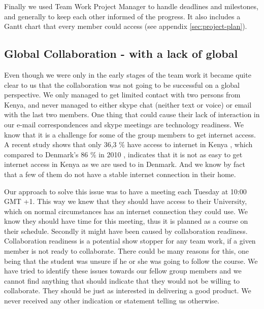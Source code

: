 Finally we used Team Work Project Manager to handle deadlines and milestones, and generally to keep each other informed of the progress. It also includes a Gantt chart that every member could access (see appendix \ref{sec:project-plan}).

\subsection{Global Collaboration - with a lack of global} \label{sec:teamworkgonewrong}
Even though we were only in the early stages of the team work it became quite clear to us that the collaboration was not going to be successful on a global perspective. We only managed to get limited contact with two persons from Kenya, and never managed to either skype chat (neither text or voice) or email with the last two members. One thing that could cause their lack of interaction in our e-mail correspondences and skype meetings are technology readiness. We know that it is a challenge for some of the group members to get internet access. A recent study shows that only 36,3 \% have access to internet in Kenya \cite{capitalfm2012internet}, which compared to Denmark's 86 \% in 2010 \cite{folketingets-eu-oplysning}, indicates that it is not as easy to get internet access in Kenya as we are used to in Denmark. And we know by fact that a few of them do not have a stable internet connection in their home. 

Our approach to solve this issue was to have a meeting each Tuesday at 10:00 GMT +1. This way we knew that they should have access to their University, which on normal circumstances has an internet connection they could use. We know they should have time for this meeting, thus it is planned as a course on their schedule. Secondly it might have been caused by collaboration readiness. Collaboration readiness is a potential show stopper for any team work, if a given member is not ready to collaborate. There could be many reasons for this, one being that the student was unsure if he or she was going to follow the course. We have tried to identify these issues towards our fellow group members and we cannot find anything that should indicate that they would not be willing to collaborate. They should be just as interested in delivering a good product. We never received any other indication or statement telling us otherwise.

